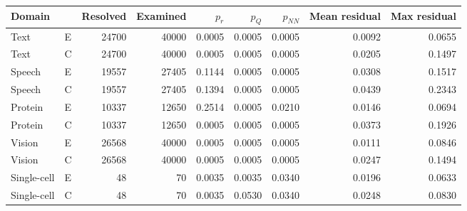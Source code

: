 \begin{tabular}{llrrrrrrr}
\toprule
Domain &  & Resolved & Examined & $p_r$ & $p_Q$ & $p_{NN}$ & Mean residual & Max residual \\
\midrule
Text & E & 24700 & 40000 & 0.0005 & 0.0005 & 0.0005 & 0.0092 & 0.0655 \\
Text & C & 24700 & 40000 & 0.0005 & 0.0005 & 0.0005 & 0.0205 & 0.1497 \\
Speech & E & 19557 & 27405 & 0.1144 & 0.0005 & 0.0005 & 0.0308 & 0.1517 \\
Speech & C & 19557 & 27405 & 0.1394 & 0.0005 & 0.0005 & 0.0439 & 0.2343 \\
Protein & E & 10337 & 12650 & 0.2514 & 0.0005 & 0.0210 & 0.0146 & 0.0694 \\
Protein & C & 10337 & 12650 & 0.0005 & 0.0005 & 0.0005 & 0.0373 & 0.1926 \\
Vision & E & 26568 & 40000 & 0.0005 & 0.0005 & 0.0005 & 0.0111 & 0.0846 \\
Vision & C & 26568 & 40000 & 0.0005 & 0.0005 & 0.0005 & 0.0247 & 0.1494 \\
Single-cell & E & 48 & 70 & 0.0035 & 0.0035 & 0.0340 & 0.0196 & 0.0633 \\
Single-cell & C & 48 & 70 & 0.0035 & 0.0530 & 0.0340 & 0.0248 & 0.0830 \\
\bottomrule
\end{tabular}
